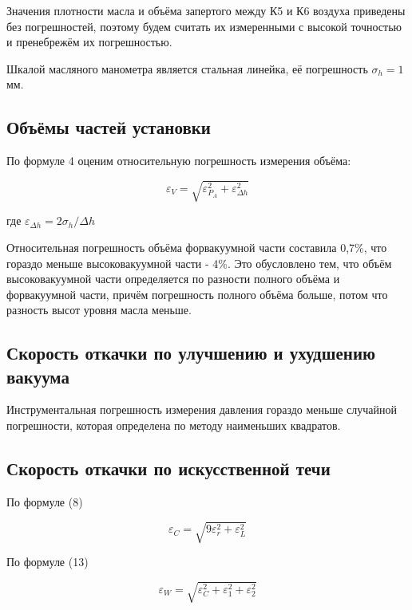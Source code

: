 \documentclass[14pt]{article}
\begin{document}
	Значения плотности масла и объёма запертого между К5 и К6 воздуха приведены без погрешностей, поэтому будем считать их измеренными с высокой точностью и пренебрежём их погрешностью.
	
	Шкалой масляного манометра является стальная линейка, её погрешность $\sigma_h = 1$ мм.
	
	
	
	\subsection*{Объёмы частей установки}
	\hspace{4mm} По формуле 4 оценим относительную погрешность измерения объёма:
	
	\begin{equation}
		\varepsilon_V = \sqrt{\varepsilon_{P_A}^2 + \varepsilon_{\Delta h}^2}
	\end{equation}	
	
	где $\varepsilon_{\Delta h} = 2\sigma_h / \Delta h$
	
	Относительная погрешность объёма форвакуумной части составила 0,7\%, что гораздо меньше высоковакуумной части - 4\%. Это обусловлено тем, что объём высоковакуумной части определяется по разности полного объёма и форвакуумной части, причём погрешность полного объёма больше, потом что разность высот уровня масла меньше. 
	
	\subsection*{Скорость откачки по улучшению и ухудшению вакуума}
	
	\hspace{4mm} Инструментальная погрешность измерения давления гораздо меньше случайной погрешности, которая определена по методу наименьших квадратов.
	
	\subsection*{Скорость откачки по искусственной течи}
	
	\hspace{4mm}По формуле (8)
	
	\begin{equation}
		\varepsilon_C = \sqrt{9\varepsilon_r^2 + \varepsilon_L^2}
	\end{equation}
	
	По формуле (13)
	
	\begin{equation}
		\varepsilon_W = \sqrt{\varepsilon_C^2 + \varepsilon_1^2 +  \varepsilon_2^2}
	\end{equation}
	
\end{document}
